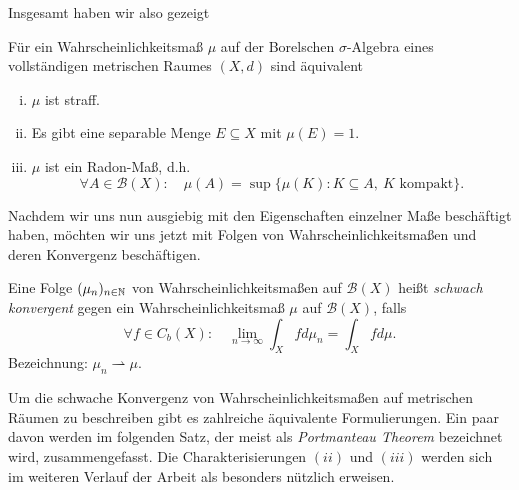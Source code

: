 Insgesamt haben wir also gezeigt

\begin{theorem}
    Für ein Wahrscheinlichkeitsmaß $\mu$ auf der Borelschen $\sigma$-Algebra eines vollständigen metrischen Raumes $(X,d)$ sind äquivalent
    \begin{enumerate}[(i)]
        \item $\mu$ ist straff.
        \item Es gibt eine separable Menge $E \subseteq X$ mit $\mu(E) = 1$.
        \item $\mu$ ist ein Radon-Maß, d.h.
        $$
        \forall A \in \mathcal{B}(X): \quad \mu(A) = \sup\{\mu(K): K \subseteq A, \ K \text{ kompakt}\}.
        $$   
    \end{enumerate}
\end{theorem}

Nachdem wir uns nun ausgiebig mit den Eigenschaften einzelner Maße beschäftigt haben, möchten wir uns jetzt mit Folgen von Wahrscheinlichkeitsmaßen und deren Konvergenz beschäftigen. 

\begin{mydef}
    Eine Folge $(\mu_n)_{n \in \mathbb{N}}$ von Wahrscheinlichkeitsmaßen auf $\mathcal{B}(X)$ heißt \textit{schwach konvergent} 
    gegen ein Wahrscheinlichkeitsmaß $\mu$ auf $\mathcal{B}(X)$, falls 
    $$
        \forall f \in C_b(X): \quad \lim_{n \to \infty} \int_Xfd\mu_n = \int_X fd\mu . 
    $$
    Bezeichnung: $\mu_n \rightharpoonup \mu$. 
\end{mydef}

Um die schwache Konvergenz von Wahrscheinlichkeitsmaßen auf metrischen Räumen zu beschreiben gibt es zahlreiche äquivalente Formulierungen. 
Ein paar davon werden im folgenden Satz, der meist als \textit{Portmanteau Theorem} bezeichnet wird, zusammengefasst. 
Die Charakterisierungen $(ii)$ und $(iii)$ werden sich im weiteren Verlauf der Arbeit als besonders nützlich erweisen. 

